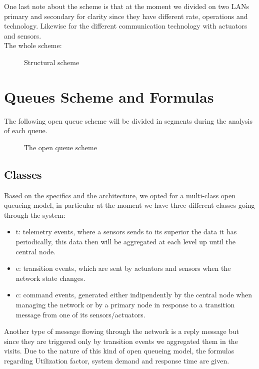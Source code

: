 \documentclass[11pt]{article}
\begin{document}
One last note about the scheme is that at the moment we divided on two LANs primary and secondary for clarity since they have different rate, operations and technology. Likewise for the different communication technology with actuators and sensors.\\
The whole scheme:
\begin{figure}[H]
	\hspace*{-3.75cm}
	\frame{}
  \caption{Structural scheme}
\end{figure}

\section{Queues Scheme and Formulas}
The following open queue scheme will be divided in segments during the analysis of each queue.
\begin{figure}[H]
	\vspace*{-0.5cm}
	\hspace*{-3.5cm}
	\centering
	\frame{}
	\caption{The open queue scheme}
\end{figure}
\subsection{Classes}
Based on the specifics and the architecture, we opted for a multi-class open queueing model, in particular at the moment we have three different classes going through the system:
\begin{itemize}
\item t: telemetry events, where a sensors sends to its superior the data it has periodically, this data then will be aggregated at each level up until the central node.
\item e: transition events, which are sent by actuators and sensors when the network state changes.
\item c: command events, generated either indipendently by the central node when managing the network or by a primary node in response to a transition message from one of its sensors/actuators.
\end{itemize}
Another type of message flowing through the network is a reply message but since they are triggered only by transition events we aggregated them in the visits.
Due to the nature of this kind of open queueing model, the formulas regarding Utilization factor, system demand and response time are given.
\end{document}

